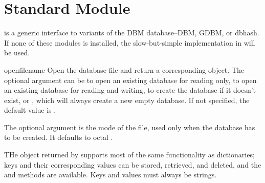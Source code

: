 \section{Standard Module }

 is a generic interface to variants of the DBM
database--DBM, GDBM, or dbhash.  If none of these modules is
installed, the slow-but-simple implementation in 
will be used.   

\begin{funcdesc}{open}{filename}
Open the database file  and return a corresponding object.  
The optional  argument can be
 to open an existing database for reading only,
 to open an existing database for reading and writing,
 to create the database if it doesn't exist, or
, which will always create a new empty database.  If not
specified, the default value is .

The optional  argument is the \UNIX{} mode of the file, used
only when the database has to be created.  It defaults to octal
.
\end{funcdesc}

THe object returned by  supports most of the same
functionality as dictionaries; keys and their corresponding values can
be stored, retrieved, and deleted, and the  and
 methods are available. Keys and values must always be strings.


